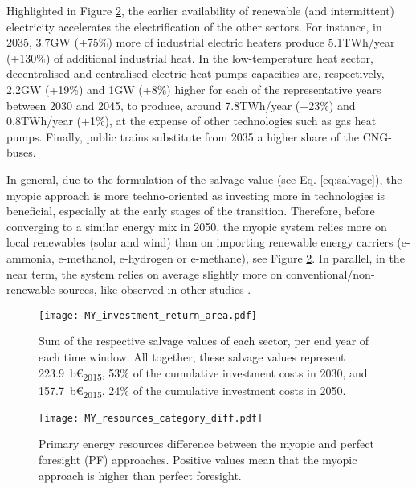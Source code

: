 Highlighted in Figure \ref{fig:my_pestd_res_cat_diff}, the earlier availability of renewable (and intermittent) electricity accelerates the electrification of the other sectors. For instance, in 2035, 3.7GW (+75\%) more of industrial electric heaters produce 5.1TWh/year (+130\%) of additional industrial heat. In the low-temperature heat sector, decentralised and centralised electric heat pumps capacities are, respectively, 2.2GW (+19\%) and 1GW (+8\%) higher for each of the representative years between 2030 and 2045, to produce, around 7.8TWh/year (+23\%) and 0.8TWh/year (+1\%), at the expense of other technologies such as gas heat pumps. Finally, public trains substitute from 2035 a higher share of the CNG-buses.

In general, due to the formulation of the salvage value (see Eq. \ref{eq:salvage}), the myopic approach is more techno-oriented as investing more in technologies is beneficial, especially at the early stages of the transition. Therefore, before converging to a similar energy mix in 2050, the myopic system relies more on local renewables (\eg solar and wind) than on importing renewable energy carriers (\eg e-ammonia, e-methanol, e-hydrogen or e-methane), see Figure \ref{fig:my_pestd_res_cat_diff}. In parallel, in the near term, the system relies on average slightly more on conventional/non-renewable sources, like observed in other studies \cite{keppo2010short,nyqvist2005limited,hedenus2006induced}.

\begin{figure}[!htbp]
\centering
\texttt{[image: MY\_investment\_return\_area.pdf]}
\caption{Sum of the respective salvage values of each sector, per end year of each time window. All together, these salvage values represent 223.9~b€\textsubscript{2015}, 53\% of the cumulative investment costs in 2030, and 157.7~b€\textsubscript{2015}, 24\% of the cumulative investment costs in 2050.}
\label{fig:my_pestd_inv_return_area}
\end{figure}

 \begin{figure}[!htbp]
\centering
\texttt{[image: MY\_resources\_category\_diff.pdf]}
\caption{Primary energy resources difference between the myopic and perfect foresight (PF) approaches. Positive values mean that the myopic approach is higher than perfect foresight.}
\label{fig:my_pestd_res_cat_diff}
\end{figure}

